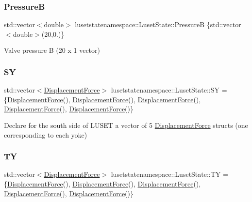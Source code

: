 \subsubsection{\texorpdfstring{PressureB}{PressureB}}
{\footnotesize\ttfamily std\+::vector$<$double$>$ lusetstatenamespace\+::\+Luset\+State\+::\+PressureB \{std\+::vector$<$double$>$(20,0.)\}}



Valve pressure B (20 x 1 vector) 

\mbox{\label{classlusetstatenamespace_1_1LusetState_a2cc7ce891b92ece12b0d5679dba5728c}} 
\subsubsection{\texorpdfstring{SY}{SY}}
{\footnotesize\ttfamily std\+::vector$<$\hyperlink{structlusetstatenamespace_1_1LusetState_1_1DisplacementForce}{Displacement\+Force}$>$ lusetstatenamespace\+::\+Luset\+State\+::\+SY = \{\hyperlink{structlusetstatenamespace_1_1LusetState_1_1DisplacementForce}{Displacement\+Force}(), \hyperlink{structlusetstatenamespace_1_1LusetState_1_1DisplacementForce}{Displacement\+Force}(), \hyperlink{structlusetstatenamespace_1_1LusetState_1_1DisplacementForce}{Displacement\+Force}(), \hyperlink{structlusetstatenamespace_1_1LusetState_1_1DisplacementForce}{Displacement\+Force}(), \hyperlink{structlusetstatenamespace_1_1LusetState_1_1DisplacementForce}{Displacement\+Force}()\}}



Declare for the south side of L\+U\+S\+ET a vector of 5 \hyperlink{structlusetstatenamespace_1_1LusetState_1_1DisplacementForce}{Displacement\+Force} structs (one corresponding to each yoke) 

\mbox{\label{classlusetstatenamespace_1_1LusetState_a492da5d53a18a795c781cefb3ceb98c9}} 
\subsubsection{\texorpdfstring{TY}{TY}}
{\footnotesize\ttfamily std\+::vector$<$\hyperlink{structlusetstatenamespace_1_1LusetState_1_1DisplacementForce}{Displacement\+Force}$>$ lusetstatenamespace\+::\+Luset\+State\+::\+TY = \{\hyperlink{structlusetstatenamespace_1_1LusetState_1_1DisplacementForce}{Displacement\+Force}(), \hyperlink{structlusetstatenamespace_1_1LusetState_1_1DisplacementForce}{Displacement\+Force}(), \hyperlink{structlusetstatenamespace_1_1LusetState_1_1DisplacementForce}{Displacement\+Force}(), \hyperlink{structlusetstatenamespace_1_1LusetState_1_1DisplacementForce}{Displacement\+Force}(), \hyperlink{structlusetstatenamespace_1_1LusetState_1_1DisplacementForce}{Displacement\+Force}()\}}



